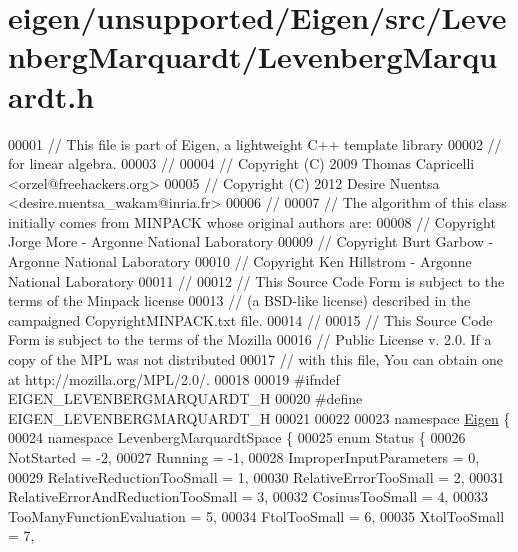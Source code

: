\hypertarget{eigen_2unsupported_2_eigen_2src_2_levenberg_marquardt_2_levenberg_marquardt_8h_source}{}\section{eigen/unsupported/\+Eigen/src/\+Levenberg\+Marquardt/\+Levenberg\+Marquardt.h}
\label{eigen_2unsupported_2_eigen_2src_2_levenberg_marquardt_2_levenberg_marquardt_8h_source}

\begin{DoxyCode}
00001 \textcolor{comment}{// This file is part of Eigen, a lightweight C++ template library}
00002 \textcolor{comment}{// for linear algebra.}
00003 \textcolor{comment}{//}
00004 \textcolor{comment}{// Copyright (C) 2009 Thomas Capricelli <orzel@freehackers.org>}
00005 \textcolor{comment}{// Copyright (C) 2012 Desire Nuentsa <desire.nuentsa\_wakam@inria.fr>}
00006 \textcolor{comment}{//}
00007 \textcolor{comment}{// The algorithm of this class initially comes from MINPACK whose original authors are:}
00008 \textcolor{comment}{// Copyright Jorge More - Argonne National Laboratory}
00009 \textcolor{comment}{// Copyright Burt Garbow - Argonne National Laboratory}
00010 \textcolor{comment}{// Copyright Ken Hillstrom - Argonne National Laboratory}
00011 \textcolor{comment}{//}
00012 \textcolor{comment}{// This Source Code Form is subject to the terms of the Minpack license}
00013 \textcolor{comment}{// (a BSD-like license) described in the campaigned CopyrightMINPACK.txt file.}
00014 \textcolor{comment}{//}
00015 \textcolor{comment}{// This Source Code Form is subject to the terms of the Mozilla}
00016 \textcolor{comment}{// Public License v. 2.0. If a copy of the MPL was not distributed}
00017 \textcolor{comment}{// with this file, You can obtain one at http://mozilla.org/MPL/2.0/.}
00018 
00019 \textcolor{preprocessor}{#ifndef EIGEN\_LEVENBERGMARQUARDT\_H}
00020 \textcolor{preprocessor}{#define EIGEN\_LEVENBERGMARQUARDT\_H}
00021 
00022 
00023 \textcolor{keyword}{namespace }\hyperlink{namespace_eigen}{Eigen} \{
00024 \textcolor{keyword}{namespace }LevenbergMarquardtSpace \{
00025     \textcolor{keyword}{enum} Status \{
00026         NotStarted = -2,
00027         Running = -1,
00028         ImproperInputParameters = 0,
00029         RelativeReductionTooSmall = 1,
00030         RelativeErrorTooSmall = 2,
00031         RelativeErrorAndReductionTooSmall = 3,
00032         CosinusTooSmall = 4,
00033         TooManyFunctionEvaluation = 5,
00034         FtolTooSmall = 6,
00035         XtolTooSmall = 7,

\end{DoxyCode}

